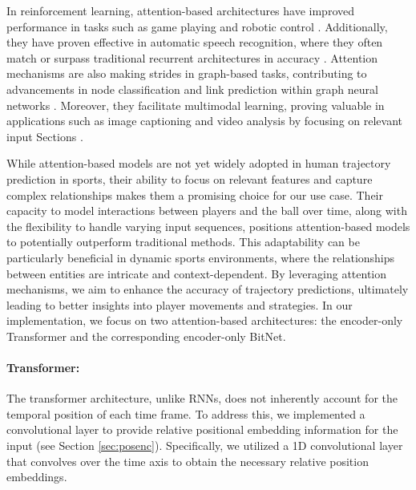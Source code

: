 In reinforcement learning, attention-based architectures have improved performance in tasks such as game playing and robotic control \cite{parisotto2017}. Additionally, they have proven effective in automatic speech recognition, where they often match or surpass traditional recurrent architectures in accuracy \cite{choromanski2020}. Attention mechanisms are also making strides in graph-based tasks, contributing to advancements in node classification and link prediction within graph neural networks \cite{velickovic2018}. Moreover, they facilitate multimodal learning, proving valuable in applications such as image captioning and video analysis by focusing on relevant input Sections \cite{chen2018}.

While attention-based models are not yet widely adopted in human trajectory prediction in sports, their ability to focus on relevant features and capture complex relationships makes them a promising choice for our use case. Their capacity to model interactions between players and the ball over time, along with the flexibility to handle varying input sequences, positions attention-based models to potentially outperform traditional methods. This adaptability can be particularly beneficial in dynamic sports environments, where the relationships between entities are intricate and context-dependent. By leveraging attention mechanisms, we aim to enhance the accuracy of trajectory predictions, ultimately leading to better insights into player movements and strategies. In our implementation, we focus on two attention-based architectures: the encoder-only Transformer and the corresponding encoder-only BitNet.

\paragraph{Transformer:}
\label{sec:transformer-details}

The transformer architecture, unlike RNNs, does not inherently account for the temporal position of each time frame. To address this, we implemented a convolutional layer to provide relative positional embedding information for the input (see Section \ref{sec:posenc}). Specifically, we utilized a 1D convolutional layer that convolves over the time axis to obtain the necessary relative position embeddings.

